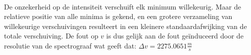 \documentclass[12pt]{article}
\begin{document}
\\
De onzekerheid op de intensiteit verschuift elk minimum willekeurig. Maar de relatieve positie van alle minima is gekend, en een grotere verzameling van willekeurige verschuivingen resulteert in een kleinere standaardafwijking van de totale verschuiving. De fout op $v$ is dus gelijk aan de fout geïnduceerd door de resolutie van de spectrograaf wat geeft dat: $\Delta v = 2275.0651 \frac{m}{s}$
\end{document}
